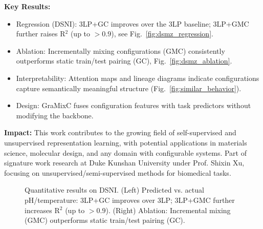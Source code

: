 \textbf{Key Results:}
\begin{itemize}[leftmargin=1.2em, itemsep=0.1em]
  \item Regression (DSNI): 3LP+GC improves over the 3LP baseline; 3LP+GMC further raises R$^2$ (up to $>0.9$), see Fig.~\ref{fig:dsmz_regression}.
  \item Ablation: Incrementally mixing configurations (GMC) consistently outperforms static train/test pairing (GC), Fig.~\ref{fig:dsmz_ablation}.
  \item Interpretability: Attention maps and lineage diagrams indicate configurations capture semantically meaningful structure (Fig.~\ref{fig:similar_behavior}).
  \item Design: GraMixC fuses configuration features with task predictors without modifying the backbone.
\end{itemize}


\textbf{Impact:} 
This work contributes to the growing field of self-supervised and unsupervised representation learning, with potential applications in materials science, molecular design, and any domain with configurable systems. Part of signature work research at Duke Kunshan University under Prof. Shixin Xu, focusing on unsupervised/semi-supervised methods for biomedical tasks.

\begin{figure}[ht]
  \centering
  \hfill
  \caption{Quantitative results on DSNI. (Left) Predicted vs. actual pH/temperature: 3LP+GC improves over 3LP; 3LP+GMC further increases R$^2$ (up to $>0.9$). (Right) Ablation: Incremental mixing (GMC) outperforms static train/test pairing (GC).}
\end{figure}